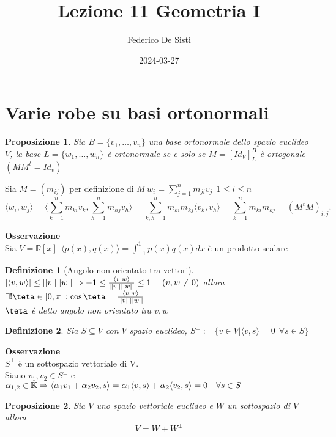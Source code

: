 \documentclass[12px]{article}
\title{Lezione 11 Geometria I}
\date{2024-03-27}
\author{Federico De Sisti}
\theoremstyle{break}
\theoremstyle{break}
\theoremstyle{break}
\newtheorem{defin}{Definizione}
\theoremstyle{break}
\newtheorem{propo}{Proposizione}
\theoremstyle{break}
\newtheorem*{dimo}{Dimostrazione}
\theoremstyle{break}
\newenvironment{dimo}
  {\begin{dimostrazione}}
  {\hfill\square\newline\end{dimostrazione}}
\newenvironment{prop}
{\begin{mdframed}[linecolor=red, backgroundcolor=red!10]\begin{propo}}
  {\end{propo}\end{mdframed}}
\newenvironment{defi}
{\begin{mdframed}[linecolor=orange, backgroundcolor=orange!10]\begin{defin}}
  {\end{defin}\end{mdframed}}
\begin{document}
	\maketitle
	\newpage
	\section{Varie robe su basi ortonormali}
	\begin{prop}
		Sia $B = \{v_1,\ldots,v_n\}$ una base ortonormale dello spazio euclideo $V$, la base $L = \{w_1,\ldots,w_n\}$ è ortonormale se e solo se $M = [Id_V]^B_L$ è ortogonale $(MM^t = Id_v)$
	\end{prop}
	\begin{dimo}
		Sia $M = (m_{ij})$ per definizione di $M \ w_i = \sum^n_{j=1}m_{ji}v_j \ \ 1\leq i\leq n$
		\[
			\langle w_i, w_j \rangle = \langle \sum^n_{k=1}m_{ki}v_k, \sum^n_{h=1}m_{hj}v_h \rangle = \sum^n_{k,h=1}m_{ki}m_{kj} \langle v_k, v_h \rangle  = \sum^n_{k=1}m_{ki}m_{kj} = (M^tM)_{i,j}
		.\] 
	\end{dimo} 
	\textbf{Osservazione}\\
	Sia $V = \mathbb{R}[x] \ \ \langle p(x), q(x) \rangle = \int_{-1}^1p(x)q(x)dx$ è un prodotto scalare\\
	\begin{defi}[Angolo non orientato tra vettori]
		$| \langle v,w  \rangle | \leq ||v||||w|| \Rightarrow -1\leq \frac{ \langle v, w \rangle }{||v||||w||}\leq 1 \ \ \ \ (v,w\neq 0)\\$ allora $\\ \exists!\teta\in [0,\pi] : \cos\teta = \frac{ \langle v, w \rangle }{||v||||w||}$\\
		$\teta$ è detto angolo non orientato tra $v,w$
	\end{defi}
	\begin{defi}
		Sia $S\subseteq V$ con $V$ spazio euclideo, $S^\perp:=\{v\in V | \langle v, s \rangle = 0 \ \  \forall s\in S\}$
	\end{defi}
	\textbf{Osservazione} \\
	$S^\perp$ è un sottospazio vettoriale di V. \\ Siano $v_1,v_2\in S^\perp$ e $ \alpha_{1,2}\in \mathbb{K}\\ \Rightarrow  \langle \alpha_1v_1 + \alpha_2v_2, s \rangle = \alpha_1 \langle v, s \rangle + \alpha_2 \langle v_2, s \rangle  = 0 \ \ \ \forall s\in S$
	\newpage
\begin{prop}
	Sia $V$ uno spazio vettoriale euclideo e $W$ un sottospazio di $V$ allora \[ V = W + W^\perp\]
\end{prop}
\end{document}

